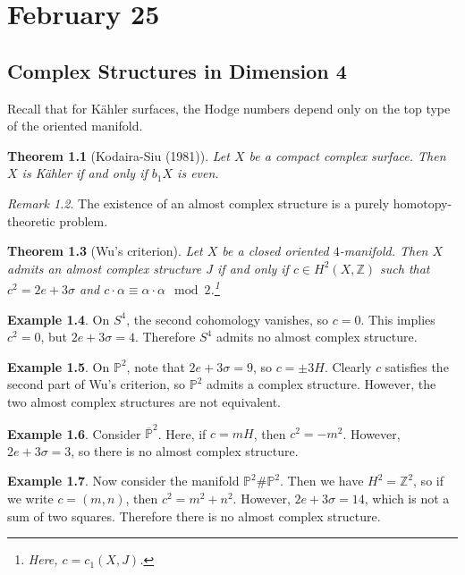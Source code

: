 \documentclass[leqno, openany]{memoir}
\newtheorem{thm}{Theorem}[chapter]
\theoremstyle{definition}
\newtheorem{exm}[thm]{Example}
\theoremstyle{remark}
\newtheorem{rmk}[thm]{Remark}
\theoremstyle{plain}
\theoremstyle{definition}
\theoremstyle{remark}
\newcommand{\Z}{\mathbb{Z}}
\renewcommand{\P}{\mathbb{P}}
\begin{document}
\chapter{February 25}%
\label{cha:february_25}

\section{Complex Structures in Dimension 4}%
\label{sec:complex_structures_in_dimension_4_continued}

Recall that for K\"ahler surfaces, the Hodge numbers depend only on the top type of the oriented manifold.

\begin{thm}[Kodaira-Siu (1981)]
    Let $X$ be a compact complex surface. Then $X$ is K\"ahler if and only if $b_1X$ is even.
\end{thm}

\begin{rmk}
    The existence of an almost complex structure is a purely homotopy-theoretic problem.
\end{rmk}

\begin{thm}[Wu's criterion]
    Let $X$ be a closed oriented $4$-manifold. Then $X$ admits an almost complex structure $J$ if and only if $c \in H^2(X, \Z)$ such that $c^2 = 2e + 3 \sigma$ and $c \cdot \alpha \equiv \alpha \cdot \alpha \mod 2$.\footnote{Here, $c = c_1(X, J)$.}
\end{thm}

\begin{exm}
    On $S^4$, the second cohomology vanishes, so $c = 0$. This implies $c^2 = 0$, but $2e + 3 \sigma = 4$. Therefore $S^4$ admits no almost complex structure.
\end{exm}

\begin{exm}
    On $\P^2$, note that $2e + 3 \sigma = 9$, so $c = \pm 3H$. Clearly $c$ satisfies the second part of Wu's criterion, so $\P^2$ admits a complex structure. However, the two almost complex structures are not equivalent.
\end{exm}

\begin{exm}
    Consider $\overline{\P}^2$. Here, if $c = mH$, then $c^2 = -m^2$. However, $2e + 3 \sigma = 3$, so there is no almost complex structure.
\end{exm}

\begin{exm}
    Now consider the manifold $\P^2 \# \P^2$. Then we have $H^2 = \Z^2$, so if we write $c = (m,n)$, then $c^2 = m^2 + n^2$. However, $2e + 3 \sigma = 14$, which is not a sum of two squares. Therefore there is no almost complex structure.
\end{exm}
\end{document}
